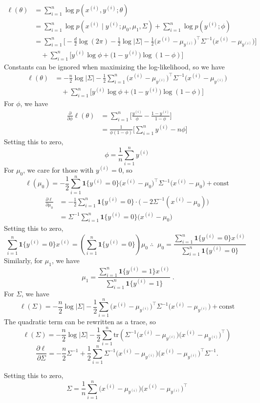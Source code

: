 \begin{answer}

$$
\begin{aligned}
\ell(\theta)
&=\sum_{i=1}^n \log p(x^{(i)},y^{(i)};\theta)\\
&=\sum_{i=1}^n \log p(x^{(i)}\mid y^{(i)};\mu_0,\mu_1,\Sigma)+\sum_{i=1}^n \log p(y^{(i)};\phi)\\
&=\sum_{i=1}^n\Bigg[-\frac{d}{2}\log(2\pi)-\frac{1}{2}\log|\Sigma|
-\frac{1}{2}\big(x^{(i)}-\mu_{y^{(i)}}\big)^\top\Sigma^{-1}\big(x^{(i)}-\mu_{y^{(i)}}\big)\Bigg]\\
&\quad +\sum_{i=1}^n\Big[y^{(i)}\log\phi+\big(1-y^{(i)}\big)\log(1-\phi)\Big]
\end{aligned}
$$
Constants can be ignored when maximizing the log-likelihood, so we have
$$
\begin{aligned}
\ell(\theta)
&=-\frac{n}{2}\log|\Sigma| - \frac{1}{2}\sum_{i=1}^n\big(x^{(i)}-\mu_{
y^{(i)}}\big)^\top\Sigma^{-1}\big(x^{(i)}-\mu_{y^{(i)}}\big)\\
&\quad +\sum_{i=1}^n\Big[y^{(i)}\log\phi+\big(1-y^{(i)}\big)\log(1-\phi)\Big]
\end{aligned}
$$
For $\phi$, we have
$$
\begin{aligned}
\frac{\partial}{\partial \phi}\ell(\theta)
&=\sum_{i=1}^n\Big[\frac{y^{(i)}}{\phi}-\frac{1-y^{(i)}}{1-\phi}\Big]\\
&=\frac{1}{\phi(1-\phi)}\Big[\sum_{i=1}^n y^{(i)} - n\phi\Big]
\end{aligned}
$$
Setting this to zero,
$$
\boxed{
\phi = \frac{1}{n}\sum_{i=1}^n y^{(i)}
}
$$
For $\mu_0$, we care for those with $y^{(i)}=0$, so
$$
\ell(\mu_0) = -\frac{1}{2}\sum_{i=1}^n \mathbf{1}\{y^{(i)}=0\}
\big(x^{(i)}-\mu_0\big)^\top\Sigma^{-1}\big(x^{(i)}-\mu_0\big) + \text{const}
$$
$$
\begin{aligned}
\frac{\partial \ell}{\partial \mu_0}
&= -\frac{1}{2}\sum_{i=1}^n \mathbf{1}\{y^{(i)}=0\}\cdot 
\big(-2\Sigma^{-1}(x^{(i)}-\mu_0)\big)\\
&=\Sigma^{-1}\sum_{i=1}^n \mathbf{1}\{y^{(i)}=0\}\big(x^{(i)}-\mu_0\big)
\end{aligned}
$$
Setting this to zero,
$$
\sum_{i=1}^n \mathbf{1}\{y^{(i)}=0\}x^{(i)}=
\left(\sum_{i=1}^n \mathbf{1}\{y^{(i)}=0\}\right)\mu_0
\;\therefore\;
\boxed{\;\displaystyle \mu_0=\frac{\sum_{i=1}^n \mathbf{1}\{y^{(i)}=0\}x^{(i)}}{\sum_{i=1}^n \mathbf{1}\{y^{(i)}=0\}}\; }
$$
Similarly, for $\mu_1$, we have
$$
\boxed{\;\displaystyle \mu_1=\frac{\sum_{i=1}^n \mathbf{1}\{y^{(i)}=1\}x^{(i)}}{\sum_{i=1}^n \mathbf{1}\{y^{(i)}=1\}}\; }.
$$
For $\Sigma$, we have
$$
\ell(\Sigma)=-\frac{n}{2}\log|\Sigma|-\frac{1}{2}\sum_{i=1}^n
\big(x^{(i)}-\mu_{y^{(i)}}\big)^\top\Sigma^{-1}\big(x^{(i)}-\mu_{y^{(i)}}\big)+\text{const}
$$
The quadratic term can be rewritten as a trace, so
$$
\ell(\Sigma)=-\frac{n}{2}\log|\Sigma|-\frac{1}{2}\sum_{i=1}^n
\text{tr}(\Sigma^{-1}\big(x^{(i)}-\mu_{y^{(i)}}\big)\big(x^{(i)}-\mu_{y^{(i)}}\big)^\top)
$$
$$
\frac{\partial \ell}{\partial \Sigma}
=-\frac{n}{2}\Sigma^{-1}+\frac{1}{2}\sum_{i=1}^n\Sigma^{-1}\big(x^{(i)}-\mu_{y^{(i)}}\big)\big(x^{(i)}-\mu_{y^{(i)}}\big)^\top\Sigma^{-1}.
$$



Setting this to zero,
$$
\boxed{
\Sigma = \frac{1}{n}\sum_{i=1}^n \big(x^{(i)}-\mu_{y^{(i)}}\big)\big(x^{(i)}-\mu_{y^{(i)}}\big)^\top
}
$$

\end{answer}

